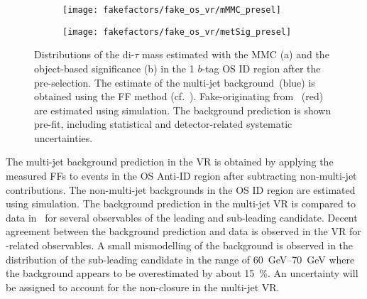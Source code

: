 \begin{figure}[htbp]
  \centering

  \begin{subfigure}{0.44\textwidth}
    \texttt{[image: fakefactors/fake\_os\_vr/mMMC\_presel]}
    \subcaption{}
  \end{subfigure}\hspace*{0.04\textwidth}%
  \begin{subfigure}{0.44\textwidth}
    \texttt{[image: fakefactors/fake\_os\_vr/metSig\_presel]}
    \subcaption{}
  \end{subfigure}

  \caption[Distributions of \mMMC and the object-based \pTmissAbs significance
  in the 1 $b$-tag OS ID region.]{Distributions of the di-$\tau$ mass estimated
    with the MMC (a) and the object-based \pTmissAbs significance (b) in the 1
    $b$-tag OS ID region after the pre-selection. The estimate of the multi-jet
    background~(blue) is obtained using the FF method
    (cf.~). Fake-\tauhadvis originating from
    \ttbar~(red) are estimated using simulation. The background prediction is
    shown pre-fit, including statistical and detector-related systematic
    uncertainties.}%
  \label{fig:fake_factor_OSVR_cutvars}
\end{figure}

The multi-jet background prediction in the VR is obtained by applying the
measured FFs to events in the OS Anti-ID region after subtracting non-multi-jet
contributions. The non-multi-jet backgrounds in the OS ID region are estimated
using simulation. The background prediction in the multi-jet VR is compared to
data in~ for several observables of the
leading and sub-leading \tauhadvis candidate. Decent agreement between the
background prediction and data is observed in the VR for \tauhadvis-related
observables. A small mismodelling of the background is observed in the \pT
distribution of the sub-leading \tauhadvis candidate in the range of
\SIrange{60}{70}{\GeV} where the background appears to be overestimated by about
\SI{15}{\percent}. An uncertainty will be assigned to account for the
non-closure in the multi-jet VR.


